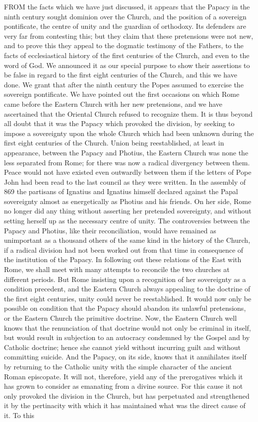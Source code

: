 FROM the facts which we have just discussed, it appears that the Papacy in the ninth century sought dominion over the Church, and the position of a sovereign pontificate, the centre of unity and the guardian of orthodoxy. Its defenders are very far from contesting this; but they claim that these pretensions were not new, and to prove this they appeal to the dogmatic testimony of the Fathers, to the facts of ecclesiastical history of the first centuries of the Church, and even to the word of God. We announced it as our special purpose to show their assertions to be false in regard to the first eight centuries of the Church, and this we have done. We grant that after the ninth century the Popes assumed to exercise the sovereign pontificate. We have pointed out the first occasions on which Rome came before the Eastern Church with her new pretensions, and we have ascertained that the Oriental Church refused to recognize them. It is thus beyond all doubt that it was the Papacy which provoked the division, by seeking to impose a sovereignty upon the whole Church which had been unknown during the first eight centuries of the Church. Union being reestablished, at least in appearance, between the Papacy and Photius, the Eastern Church was none the less separated from Rome; for there was now a radical divergency between them. Peace would not have existed even outwardly between them if the letters of Pope John had been read to the last council as they were written. In the assembly of 869 the partisans of Ignatius and Ignatius himself declared against the Papal sovereignty almost as energetically as Photius and his friends. On her side, Rome no longer did any thing without asserting her pretended sovereignty, and without setting herself up as the necessary centre of unity. The controversies between the Papacy and Photius, like their reconciliation, would have remained as unimportant as a thousand others of the same kind in the history of the Church, if a radical division had not been worked out from that time in consequence of the institution of the Papacy. In following out these relations of the East with Rome, we shall meet with many attempts to reconcile the two churches at different periods. But Rome insisting upon a recognition of her sovereignty as a condition precedent, and the Eastern Church always appealing to the doctrine of the first eight centuries, unity could never be reestablished. It would now only be possible on condition that the Papacy should abandon its unlawful pretensions, or the Eastern Church the primitive doctrine. Now, the Eastern Church well knows that the renunciation of that doctrine would not only be criminal in itself, but would result in subjection to an autocracy condemned by the Gospel and by Catholic doctrine; hence she cannot yield without incurring guilt and without committing suicide. And the Papacy, on its side, knows that it annihilates itself by returning to the Catholic unity with the simple character of the ancient Roman episcopate. It will not, therefore, yield any of the prerogatives which it has grown to consider as emanating from a divine source. For this cause it not only provoked the division in the Church, but has perpetuated and strengthened it by the pertinacity with which it has maintained what was the direct cause of it. To this 